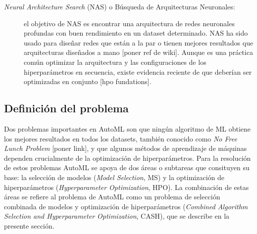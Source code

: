 \begin{description}
	\item [\textit{Neural Architecture Search} (NAS) o Búsqueda de Arquitecturas Neuronales:] el objetivo de NAS es encontrar una arquitectura de redes neuronales profundas con buen rendimiento en un dataset determinado. NAS ha sido usado para diseñar redes que están a la par o tienen mejores resultados que arquitecturas diseñados a mano [poner ref de wiki]. Aunque es una práctica común optimizar la arquitectura y las configuraciones de los hiperparámetros en secuencia, existe evidencia reciente de que deberían ser optimizadas en conjunto [hpo fundations].
\end{description}

\subsection{Definición del problema}\label{subsec:automl_problem_definition}


Dos problemas importantes en AutoML son que ningún algoritmo de ML obtiene los mejores resultados en todos los datasets, también conocido como \textit{No Free Lunch Problem} [poner link], y que algunos métodos de aprendizaje de máquinas dependen crucialmente de la optimización de hiperparámetros. Para la resolución de estos problemas AutoML se apoya de dos áreas o subtareas que consituyen su base: la selección de modelos (\textit{Model Selection}, MS) y la optimización de hiperparámetros (\textit{Hyperparameter Optimization}, HPO). La combinación de estas áreas se refiere al problema de AutoML como un problema de selección combinada de modelos y optimización de hiperparámetros (\textit{Combined Algorithm Selection and Hyperparameter Optimization}, CASH), que se describe en la presente sección.

